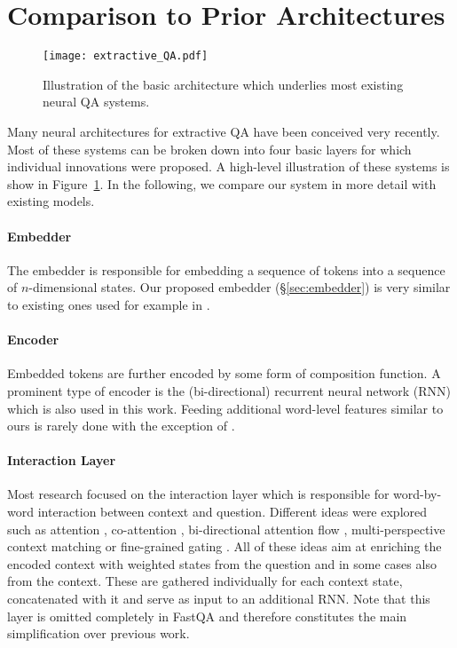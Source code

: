 \documentclass[11pt,a4paper]{article}
\begin{document}
\section{Comparison to Prior Architectures}\label{sec:comparison}

\begin{figure}[t]
    \centering
    \texttt{[image: extractive\_QA.pdf]}
    \caption{Illustration of the basic architecture which underlies most existing neural QA systems.}
    \label{fig:extractive_qa}
\end{figure}

Many neural architectures for extractive QA have been conceived very recently. Most of these systems can be broken down into four basic layers for which individual innovations were proposed. A high-level illustration of these systems is show in Figure~\ref{fig:extractive_qa}. In the following, we compare our system in more detail with existing models.

\paragraph{Embedder} The embedder is responsible for embedding a sequence of tokens into a sequence of $n$-dimensional states. Our proposed embedder (\S\ref{sec:embedder}) is very similar to existing ones used for example in .

\paragraph{Encoder} Embedded tokens are further encoded by some form of composition function. A prominent type of encoder is the (bi-directional) recurrent neural network (RNN) which is also used in this work. Feeding additional word-level features similar to ours is rarely done with the exception of .

\paragraph{Interaction Layer} Most research focused on the interaction layer which is responsible for word-by-word interaction between context and question. Different ideas were explored such as attention \cite{WangJiang2017,Yu2017}, co-attention \cite{Xiong2017}, bi-directional attention flow \cite{Seo2017}, multi-perspective context matching \cite{Wang2017} or fine-grained gating \cite{Yang2017}. All of these ideas aim at enriching the encoded context with weighted states from the question and in some cases also from the context. These are gathered individually for each context state, concatenated with it and serve as input to an additional RNN. Note that this layer is omitted completely in FastQA and therefore constitutes the main simplification over previous work.
\end{document}
